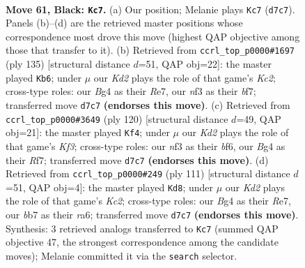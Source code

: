 \documentclass[11pt]{article}
\begin{document}
\clearpage

\begin{figure}[p]\centering
\begin{subfigure}{0.46\textwidth}\centering
\resizebox{\linewidth}{!}{%
\newchessgame
\chessboard[
  setfen={8/1B1k4/8/2B4r/PK4b1/1P3N1p/5R2/8 b - - 1 61},
  showmover=false,
  pgfstyle=straightmove, color=movearrow, markmove={d7-c7}
]}
\caption{}
\end{subfigure}\hfill
\begin{subfigure}{0.46\textwidth}\centering
\resizebox{\linewidth}{!}{%
\newchessgame
\chessboard[
  setfen={8/2k1rB2/3b4/2p5/2K5/1PP2R2/8/8 b - - 12 68},
  showmover=false,
  pgfstyle=straightmove, color=movearrow, markmove={c7-b6}
]}
\caption{}
\end{subfigure}
\\[4pt]
\begin{subfigure}{0.46\textwidth}\centering
\resizebox{\linewidth}{!}{%
\newchessgame
\chessboard[
  setfen={3k4/5Rp1/5b2/6r1/1pB5/1P3KP1/8/8 w - - 12 61},
  showmover=false,
  pgfstyle=straightmove, color=movearrow, markmove={f3-f4}
]}
\caption{}
\end{subfigure}\hfill
\begin{subfigure}{0.46\textwidth}\centering
\resizebox{\linewidth}{!}{%
\newchessgame
\chessboard[
  setfen={8/2k1r1p1/R4b2/3B2p1/4P3/5K2/6P1/8 b - - 4 56},
  showmover=false,
  pgfstyle=straightmove, color=movearrow, markmove={c7-d8}
]}
\caption{}
\end{subfigure}
\caption{\textbf{Move 61, Black: \texttt{Kc7}.} (a) Our position; Melanie plays \texttt{Kc7} (\texttt{d7c7}). Panels (b)--(d) are the retrieved master positions whose correspondence most drove this move (highest QAP objective among those that transfer to it). (b) Retrieved from \texttt{ccrl\_top\_p0000\#1697} (ply 135) [structural distance $d$=51, QAP obj=22]: the master played \texttt{Kb6}; under $\mu$ our \emph{Kd2} plays the role of that game's \emph{Kc2}; cross-type roles: our \emph{B}g4 as their \emph{R}e7, our \emph{n}f3 as their \emph{b}f7; transferred move \texttt{d7c7} \textbf{(endorses this move)}. (c) Retrieved from \texttt{ccrl\_top\_p0000\#3649} (ply 120) [structural distance $d$=49, QAP obj=21]: the master played \texttt{Kf4}; under $\mu$ our \emph{Kd2} plays the role of that game's \emph{Kf3}; cross-type roles: our \emph{n}f3 as their \emph{b}f6, our \emph{B}g4 as their \emph{R}f7; transferred move \texttt{d7c7} \textbf{(endorses this move)}. (d) Retrieved from \texttt{ccrl\_top\_p0000\#249} (ply 111) [structural distance $d$=51, QAP obj=4]: the master played \texttt{Kd8}; under $\mu$ our \emph{Kd2} plays the role of that game's \emph{Kc2}; cross-type roles: our \emph{B}g4 as their \emph{R}e7, our \emph{b}b7 as their \emph{r}a6; transferred move \texttt{d7c7} \textbf{(endorses this move)}. Synthesis: 3 retrieved analogs transferred to \texttt{Kc7} (summed QAP objective 47, the strongest correspondence among the candidate moves); Melanie committed it via the \texttt{search} selector.}
\label{fig:thought-m121}
\end{figure}
\end{document}
